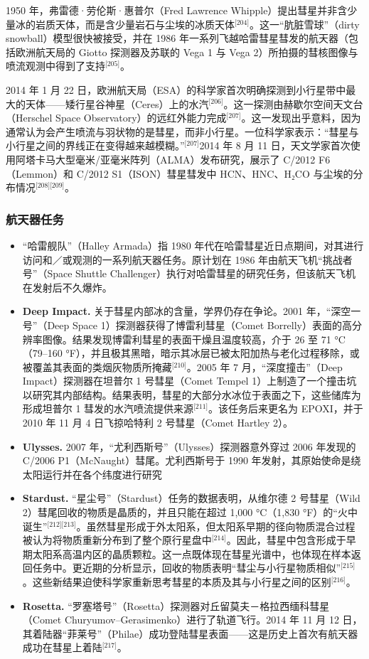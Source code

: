 1950 年，弗雷德·劳伦斯·惠普尔（Fred Lawrence Whipple）提出彗星并非含少量冰的岩质天体，而是含少量岩石与尘埃的冰质天体\(^\text{[204]}\)。这一“肮脏雪球”（dirty snowball）模型很快被接受，并在 1986 年一系列飞越哈雷彗星彗发的航天器（包括欧洲航天局的 Giotto 探测器及苏联的 Vega 1 与 Vega 2）所拍摄的彗核图像与喷流观测中得到了支持\(^\text{[205]}\)。

2014 年 1 月 22 日，欧洲航天局（ESA）的科学家首次明确探测到小行星带中最大的天体——矮行星谷神星（Ceres）上的水汽\(^\text{[206]}\)。这一探测由赫歇尔空间天文台（Herschel Space Observatory）的远红外能力完成\(^\text{[207]}\)。这一发现出乎意料，因为通常认为会产生喷流与羽状物的是彗星，而非小行星。一位科学家表示：“彗星与小行星之间的界线正在变得越来越模糊。”\(^\text{[207]}\)2014 年 8 月 11 日，天文学家首次使用阿塔卡马大型毫米/亚毫米阵列（ALMA）发布研究，展示了 C/2012 F6（Lemmon）和 C/2012 S1（ISON）彗星彗发中 HCN、HNC、H₂CO 与尘埃的分布情况\(^\text{[208][209]}\)。
\subsubsection{航天器任务}  
\begin{itemize}
\item “哈雷舰队”（Halley Armada）指 1980 年代在哈雷彗星近日点期间，对其进行访问和／或观测的一系列航天器任务。原计划在 1986 年由航天飞机“挑战者号”（Space Shuttle Challenger）执行对哈雷彗星的研究任务，但该航天飞机在发射后不久爆炸。
\item \textbf{Deep Impact.} 关于彗星内部冰的含量，学界仍存在争论。2001 年，“深空一号”（Deep Space 1）探测器获得了博雷利彗星（Comet Borrelly）表面的高分辨率图像。结果发现博雷利彗星的表面干燥且温度较高，介于 26 至 71 °C（79–160 °F），并且极其黑暗，暗示其冰层已被太阳加热与老化过程移除，或被覆盖其表面的类烟灰物质所掩藏\(^\text{[210]}\)。2005 年 7 月，“深度撞击”（Deep Impact）探测器在坦普尔 1 号彗星（Comet Tempel 1）上制造了一个撞击坑以研究其内部结构。结果表明，彗星的大部分水冰位于表面之下，这些储库为形成坦普尔 1 彗发的水汽喷流提供来源\(^\text{[211]}\)。该任务后来更名为 EPOXI，并于 2010 年 11 月 4 日飞掠哈特利 2 号彗星（Comet Hartley 2）。
\item \textbf{Ulysses.} 2007 年，“尤利西斯号”（Ulysses）探测器意外穿过 2006 年发现的 C/2006 P1（McNaught）彗尾。尤利西斯号于 1990 年发射，其原始使命是绕太阳运行并在各个纬度进行研究
\item \textbf{Stardust.} “星尘号”（Stardust）任务的数据表明，从维尔德 2 号彗星（Wild 2）彗尾回收的物质是晶质的，并且只能在超过 1,000 °C（1,830 °F）的“火中诞生”\(^\text{[212][213]}\)。虽然彗星形成于外太阳系，但太阳系早期的径向物质混合过程被认为将物质重新分布到了整个原行星盘中\(^\text{[214]}\)。因此，彗星中包含形成于早期太阳系高温内区的晶质颗粒。这一点既体现在彗星光谱中，也体现在样本返回任务中。更近期的分析显示，回收的物质表明“彗尘与小行星物质相似”\(^\text{[215]}\)。这些新结果迫使科学家重新思考彗星的本质及其与小行星之间的区别\(^\text{[216]}\)。
\item \textbf{Rosetta.} “罗塞塔号”（Rosetta）探测器对丘留莫夫－格拉西缅科彗星（Comet Churyumov–Gerasimenko）进行了轨道飞行。2014 年 11 月 12 日，其着陆器“菲莱号”（Philae）成功登陆彗星表面——这是历史上首次有航天器成功在彗星上着陆\(^\text{[217]}\)。
\end{itemize}
